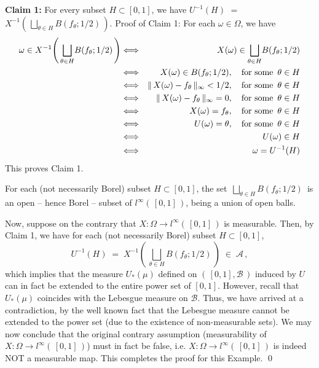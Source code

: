 \vskip 0.5cm
\noindent
\textbf{Claim 1:}\;\;
For every subset $H \subset [0,1]$, we have
$U^{-1}(H)$ $=$ $X^{-1}\!\left(\,\underset{\theta\in H}{\bigsqcup}B(f_{\theta};1/2)\,\right)$.
\vskip 0.3cm
\noindent
Proof of Claim 1:\quad
For each $\omega \in \Omega$, we have
\begin{eqnarray*}
\omega \in X^{-1}\!\left(\,\underset{\theta\in H}{\bigsqcup}B(f_{\theta};1/2)\,\right)
&\Longleftrightarrow&
	X(\omega) \in \underset{\theta\in H}{\bigsqcup}B(f_{\theta};1/2)
\\
&\Longleftrightarrow&
	X(\omega) \in B(f_{\theta};1/2),
	\quad
	\textnormal{for some \,$\theta \in H$}
\\
&\Longleftrightarrow&
	\Vert\, X(\omega) - f_{\theta}\,\Vert_{\infty} < 1/2,
	\quad
	\textnormal{for some \,$\theta \in H$}
\\
&\Longleftrightarrow&
	\Vert\, X(\omega) - f_{\theta}\,\Vert_{\infty} = 0,
	\quad
	\textnormal{for some \,$\theta \in H$}
\\
&\Longleftrightarrow&
	X(\omega) = f_{\theta},
	\quad
	\textnormal{for some \,$\theta \in H$}
\\
&\Longleftrightarrow&
	U(\omega) = \theta,
	\quad
	\textnormal{for some \,$\theta \in H$}
\\
&\Longleftrightarrow&
	U(\omega) \in H
\\
&\Longleftrightarrow&
	\omega = U^{-1}(H)
\end{eqnarray*}
This proves Claim 1.

\vskip 0.5cm
\noindent
For each (not necessarily Borel) subset $H \subset [0,1]$,
the set \,$\underset{\theta\in H}{\bigsqcup}B(f_{\theta};1/2)$\,
is an open -- hence Borel -- subset of $l^{\infty}(\,[0,1]\,)$,
being a union of open balls.

\vskip 0.3cm
\noindent
Now, suppose on the contrary that $X : \Omega \longrightarrow l^{\infty}(\,[0,1]\,)$ is measurable.
Then, by Claim 1, we have for each (not necessarily Borel) subset $H \subset [0,1]$,
\begin{equation*}
U^{-1}(H)
\;=\; X^{-1}\!\left(\,\underset{\theta\in H}{\bigsqcup}B(f_{\theta};1/2)\,\right)
\;\in\; \mathcal{A}\,,
\end{equation*}
which implies that the measure $U_{*}(\mu)$ defined on $(\,[0,1],\mathcal{B}\,)$
induced by $U$ can in fact be extended to the entire power set of $[0,1]$.
However, recall that $U_{*}(\mu)$ coincides with the Lebesgue measure on $\mathcal{B}$.
Thus, we have arrived at a contradiction, by the well known fact that the Lebesgue measure
cannot be extended to the power set (due to the existence of non-measurable sets).
We may now conclude that the original contrary assumption
(measurability of $X : \Omega \longrightarrow l^{\infty}(\,[0,1]\,)$)
must in fact be false, i.e. $X : \Omega \longrightarrow l^{\infty}(\,[0,1]\,)$
is indeed NOT a measurable map. This completes the proof for this Example.
\qed

